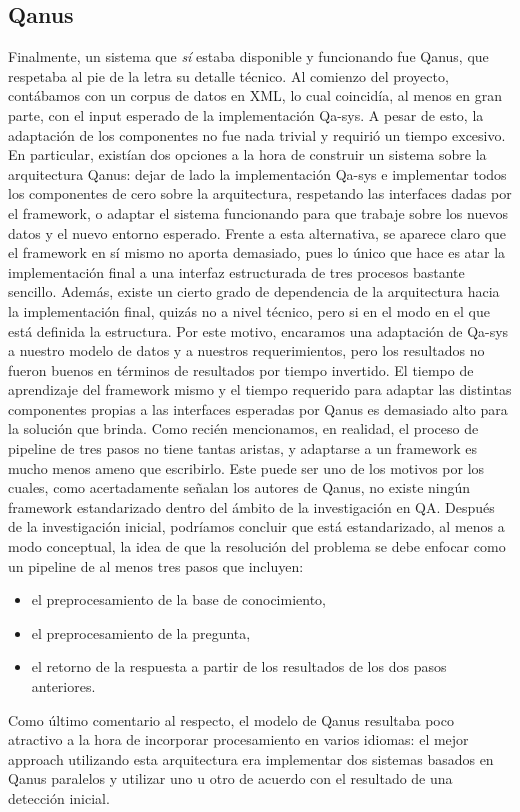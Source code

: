 \bigskip

\subsection{Qanus}

Finalmente, un sistema que \textit{s\'i} estaba disponible y funcionando
fue Qanus, que respetaba al pie de la letra su detalle t\'ecnico. Al comienzo
del proyecto, cont\'abamos con un corpus de datos en XML,
lo cual coincid\'ia, al menos en gran parte, con el input esperado de
la implementaci\'on Qa-sys. A pesar de esto, la adaptaci\'on de los
componentes no fue nada trivial y requiri\'o un tiempo excesivo. En
particular, exist\'ian dos opciones a la hora de construir un sistema
sobre la arquitectura Qanus: dejar de lado la implementaci\'on Qa-sys e
implementar todos los componentes de cero sobre la arquitectura, respetando las interfaces
dadas por el framework, o adaptar el sistema funcionando para que
trabaje sobre los nuevos datos y el nuevo entorno esperado. Frente a
esta alternativa, se aparece claro que el framework en s\'i mismo no
aporta demasiado, pues lo \'unico que hace es atar la implementaci\'on
final a una interfaz estructurada de tres procesos bastante sencillo.
Adem\'as, existe un cierto grado de dependencia de la arquitectura
hacia la implementaci\'on final, quiz\'as no a nivel t\'ecnico, pero si
en el modo en el que est\'a definida la estructura. Por este motivo,
encaramos una adaptaci\'on de Qa-sys a nuestro modelo de datos y a
nuestros requerimientos, pero los resultados no fueron buenos en
t\'erminos de resultados por tiempo invertido. El tiempo de aprendizaje
del framework mismo y el tiempo requerido para adaptar las distintas
componentes propias a las interfaces esperadas por Qanus es demasiado
alto para la soluci\'on que brinda. Como reci\'en mencionamos, en
realidad, el proceso de pipeline de tres pasos no tiene tantas aristas,
y adaptarse a un framework es mucho menos ameno que escribirlo. Este
puede ser uno de los motivos por los cuales, como acertadamente
se\~nalan los autores de Qanus, no existe ning\'un framework
estandarizado dentro del \'ambito de la investigaci\'on en QA.
Despu\'es de la investigaci\'on inicial, podr\'iamos concluir que
est\'a estandarizado, al menos a modo conceptual, la idea de que la
resoluci\'on del problema se debe enfocar como un pipeline de al menos
tres pasos que incluyen:
\begin{itemize}
\item el preprocesamiento de la base de conocimiento,
\item el preprocesamiento de la pregunta,
\item el retorno de la respuesta a partir de los resultados de los dos pasos anteriores. 
\end{itemize}
Como \'ultimo comentario al respecto, el modelo de Qanus resultaba poco atractivo
 a la hora de incorporar procesamiento en varios idiomas: el mejor approach
utilizando esta arquitectura era implementar dos sistemas basados en
Qanus paralelos y utilizar uno u otro de acuerdo con el resultado de
una detecci\'on inicial. 

